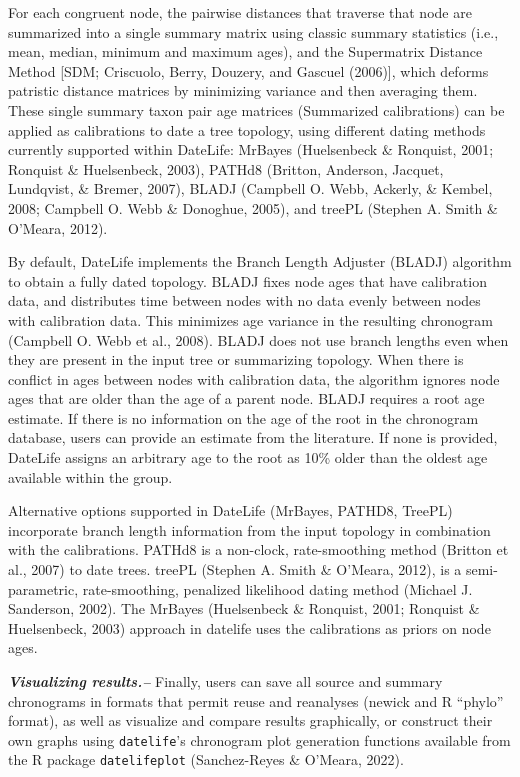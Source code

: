 \documentclass[
  man]{apa6}
\begin{document}
For each congruent node, the pairwise distances that traverse that node are summarized into a single summary matrix using classic summary statistics (i.e., mean, median, minimum and maximum ages), and the Supermatrix Distance Method {[}SDM; Criscuolo, Berry, Douzery, and Gascuel (2006){]}, which deforms patristic distance matrices by minimizing variance and then averaging them.
These single summary taxon pair age matrices (Summarized calibrations) can be applied as calibrations to date a tree topology, using different dating methods currently supported within DateLife: MrBayes (Huelsenbeck \& Ronquist, 2001; Ronquist \& Huelsenbeck, 2003), PATHd8 (Britton, Anderson, Jacquet, Lundqvist, \& Bremer, 2007), BLADJ (Campbell O. Webb, Ackerly, \& Kembel, 2008; Campbell O. Webb \& Donoghue, 2005), and treePL (Stephen A. Smith \& O'Meara, 2012).

By default, DateLife implements the Branch Length Adjuster (BLADJ) algorithm to obtain a fully dated topology. BLADJ fixes node ages that have calibration data, and distributes time between nodes with no data evenly between nodes with calibration data.
This minimizes age variance in the resulting chronogram (Campbell O. Webb et al., 2008).
BLADJ does not use branch lengths even when they are present in the input tree or summarizing topology.
When there is conflict in ages between nodes with calibration data, the algorithm ignores node ages that are older than the age of a parent node.
BLADJ requires a root age estimate. If there is no information on the age of the root in the chronogram database, users can provide an estimate from the literature. If none is provided, DateLife assigns an arbitrary age to the root as 10\% older than the oldest age available within the group.

Alternative options supported in DateLife (MrBayes, PATHD8, TreePL) incorporate branch length information from the input topology in combination with the calibrations.
PATHd8 is a non-clock, rate-smoothing method (Britton et al., 2007) to date trees.
treePL (Stephen A. Smith \& O'Meara, 2012), is a semi-parametric, rate-smoothing, penalized likelihood dating method
(Michael J. Sanderson, 2002).
The MrBayes (Huelsenbeck \& Ronquist, 2001; Ronquist \& Huelsenbeck, 2003) approach in datelife uses the calibrations as priors on node ages.

\emph{\textbf{Visualizing results.--}}
Finally, users can save all source and summary chronograms in formats that permit reuse and reanalyses (newick and R ``phylo'' format), as well as visualize and compare results graphically, or construct their own graphs using \texttt{datelife}'s chronogram plot generation functions available from the R package \texttt{datelifeplot} (Sanchez-Reyes \& O'Meara, 2022).
\end{document}
